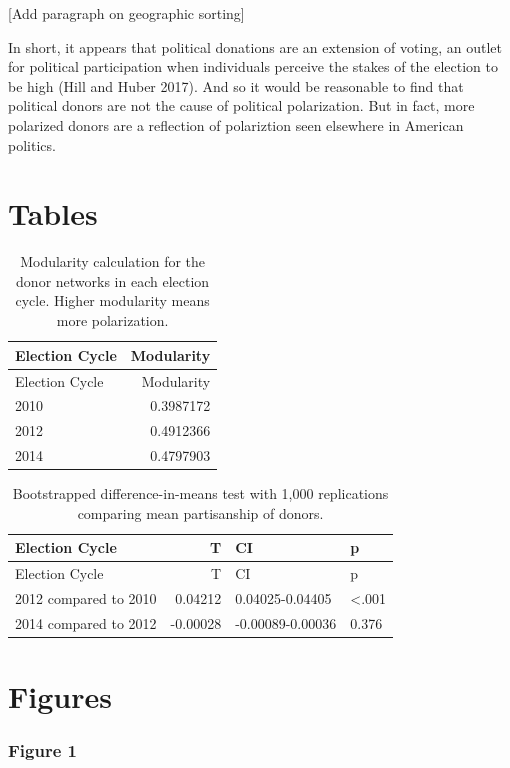 \documentclass[12pt,]{article}
\begin{document}
{[}Add paragraph on geographic sorting{]}

In short, it appears that political donations are an extension of
voting, an outlet for political participation when individuals perceive
the stakes of the election to be high (Hill and Huber 2017). And so it
would be reasonable to find that political donors are not the cause of
political polarization. But in fact, more polarized donors are a
reflection of polariztion seen elsewhere in American politics.

\newpage

\hypertarget{tables}{%
\section{Tables}\label{tables}}

\begin{longtable}[]{@{}lr@{}}
\caption{Modularity calculation for the donor networks in each election
cycle. Higher modularity means more polarization.}\tabularnewline
\toprule
Election Cycle & Modularity\tabularnewline
\midrule
\endfirsthead
\toprule
Election Cycle & Modularity\tabularnewline
\midrule
\endhead
2010 & 0.3987172\tabularnewline
2012 & 0.4912366\tabularnewline
2014 & 0.4797903\tabularnewline
\bottomrule
\end{longtable}

\newpage

\begin{longtable}[]{@{}lrll@{}}
\caption{Bootstrapped difference-in-means test with 1,000 replications
comparing mean partisanship of donors.}\tabularnewline
\toprule
Election Cycle & T & CI & p\tabularnewline
\midrule
\endfirsthead
\toprule
Election Cycle & T & CI & p\tabularnewline
\midrule
\endhead
2012 compared to 2010 & 0.04212 & 0.04025-0.04405 &
\textless.001\tabularnewline
2014 compared to 2012 & -0.00028 & -0.00089-0.00036 &
0.376\tabularnewline
\bottomrule
\end{longtable}

\newpage

\hypertarget{figures}{%
\section{Figures}\label{figures}}

\hypertarget{figure-1}{%
\subsubsection{Figure 1}\label{figure-1}}
\end{document}
